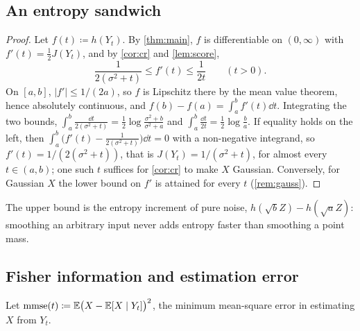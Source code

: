 \documentclass{saim-blog}
\begin{document}
\subsection{An entropy sandwich}
\begin{proof}
Let $f(t)\coloneqq h(Y_t)$. By \cref{thm:main}, $f$ is differentiable on $(0,\infty)$ with $f'(t)=\tfrac12J(Y_t)$, and by \cref{cor:cr} and \cref{lem:score},
\[
\frac1{2(\sigma^2+t)}\le f'(t)\le\frac1{2t}\qquad(t>0).
\]
On $[a,b]$, $|f'|\le1/(2a)$, so $f$ is Lipschitz there by the mean value theorem, hence absolutely continuous, and $f(b)-f(a)=\int_a^bf'(t)\dd t$. Integrating the two bounds, $\int_a^b\frac{\dd t}{2(\sigma^2+t)}=\frac12\log\frac{\sigma^2+b}{\sigma^2+a}$ and $\int_a^b\frac{\dd t}{2t}=\frac12\log\frac ba$. If equality holds on the left, then $\int_a^b\big(f'(t)-\frac1{2(\sigma^2+t)}\big)\dd t=0$ with a non-negative integrand, so $f'(t)=1/(2(\sigma^2+t))$, that is $J(Y_t)=1/(\sigma^2+t)$, for almost every $t\in(a,b)$; one such $t$ suffices for \cref{cor:cr} to make $X$ Gaussian. Conversely, for Gaussian $X$ the lower bound on $f'$ is attained for every $t$ (\cref{rem:gauss}).
\end{proof}
The upper bound is the entropy increment of pure noise, $h(\sqrt bZ)-h(\sqrt aZ)$: smoothing an arbitrary input never adds entropy faster than smoothing a point mass.

\subsection{Fisher information and estimation error}
Let $\mathrm{mmse}(t)\coloneqq\mathbb{E}\big(X-\mathbb{E}[X\mid Y_t]\big)^2$, the minimum mean-square error in estimating $X$ from $Y_t$.
\end{document}

